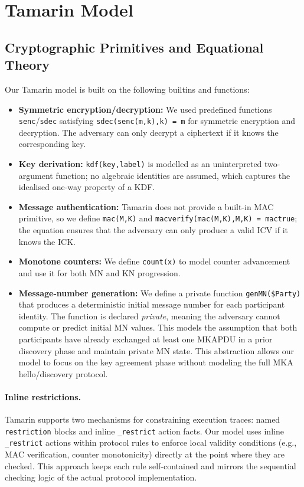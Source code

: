 \section{Tamarin Model}
\label{sec:model}

\subsection{Cryptographic Primitives and Equational Theory}

Our Tamarin model is built on the following builtins and functions:
\begin{sloppypar}
\begin{itemize}
  \item \textbf{Symmetric encryption/decryption:} We used predefined functions \texttt{senc}/\texttt{sdec} satisfying \texttt{sdec(senc(m,k),k) = m} for symmetric encryption and decryption. The adversary can only decrypt a ciphertext if it knows the corresponding key.
  \item \textbf{Key derivation:} \texttt{kdf(key,label)} is modelled as an uninterpreted two-argument function; no algebraic identities are assumed, which captures the idealised one-way property of a KDF.
  \item \textbf{Message authentication:} Tamarin does not provide a built-in MAC primitive, so we define \texttt{mac(M,K)} and \texttt{macverify(mac(M,K),M,K) = mactrue}; the equation ensures that the adversary can only produce a valid ICV if it knows the ICK.
  \item \textbf{Monotone counters:} We define \texttt{count(x)} to model counter advancement and use it for both MN and KN progression.
  \item \textbf{Message-number generation:} We define a private function \texttt{genMN(\$Party)} that produces a deterministic initial message number for each participant identity. The function is declared \emph{private}, meaning the adversary cannot compute or predict initial MN values. This models the assumption that both participants have already exchanged at least one MKAPDU in a prior discovery phase and maintain private MN state. This abstraction allows our model to focus on the key agreement phase without modeling the full MKA hello/discovery protocol.
\end{itemize}
\end{sloppypar}

\paragraph{Inline restrictions.} Tamarin supports two mechanisms for constraining execution traces: named \texttt{restriction} blocks and inline \texttt{\_restrict} action facts. Our model uses inline \texttt{\_restrict} actions within protocol rules to enforce local validity conditions (e.g., MAC verification, counter monotonicity) directly at the point where they are checked. This approach keeps each rule self-contained and mirrors the sequential checking logic of the actual protocol implementation.

